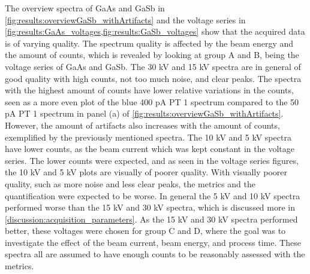 The overview spectra of GaAs and GaSb in \cref{fig:results:overviewGaSb_withArtifacts} and the voltage series in \cref{fig:results:GaAs_voltages,fig:results:GaSb_voltages} show that the acquired data is of varying quality.
The spectrum quality is affected by the beam energy and the amount of counts, which is revealed by looking at group A and B, being the voltage series of GaAs and GaSb.
The 30 kV and 15 kV spectra are in general of good quality with high counts, not too much noise, and clear peaks.
The spectra with the highest amount of counts have lower relative variations in the counts, seen as a more even plot of the blue 400 pA PT 1 spectrum compared to the 50 pA PT 1 spectrum in panel (a) of \cref{fig:results:overviewGaSb_withArtifacts}.
However, the amount of artifacts also increases with the amount of counts, exemplified by the previously mentioned spectra.
The 10 kV and 5 kV spectra have lower counts, as the beam current which was kept constant in the voltage series.
The lower counts were expected, and as seen in the voltage series figures, the 10 kV and 5 kV plots are visually of poorer quality.
With visually poorer quality, such as more noise and less clear peaks, the metrics and the quantification were expected to be worse.
In general the 5 kV and 10 kV spectra performed worse than the 15 kV and 30 kV spectra, which is discussed more in \cref{discussion:acquisition_parameters}.
As the 15 kV and 30 kV spectra performed better, these voltages were chosen for group C and D, where the goal was to investigate the effect of the beam current, beam energy, and process time.
These spectra all are assumed to have enough counts to be reasonably assessed with the metrics.


